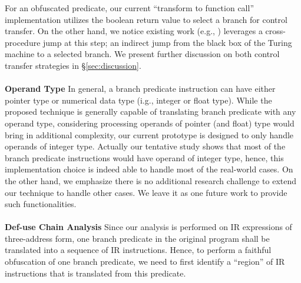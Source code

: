 \documentclass[lnicst]{svmultln}
\begin{document}
For an obfuscated predicate, our current ``transform to function call''
implementation utilizes the boolean return value to select a branch for control
transfer. On the other hand, we notice existing work (e.g., \cite{Ma, Maieee})
leverages a cross-procedure jump at this step; an indirect jump from the black
box of the Turing machine to a selected branch. We present further discussion on
both control transfer strategies in \S\ref{sec:discussion}.
\\\\
\noindent \textbf{Operand Type} In general, a branch predicate instruction can
have either pointer type or numerical data type (i.g., integer or float type).
While the proposed technique is generally capable of translating branch
predicate with any operand type, considering processing operands of pointer (and
float) type would bring in additional complexity, our current prototype is
designed to only handle operands of integer type. Actually our tentative study
shows that most of the branch predicate instructions would have operand of
integer type, hence, this implementation choice is indeed able to handle most of
the real-world cases. On the other hand, we emphasize there is no additional
research challenge to extend our technique to handle other cases. We leave it as
one future work to provide such functionalities.
\\\\
\noindent \textbf{Def-use Chain Analysis} Since our analysis is performed on IR
expressions of three-address form, one branch predicate in the original program
shall be translated into a sequence of IR instructions. Hence, to perform a
faithful obfuscation of one branch predicate, we need to first identify a
``region'' of IR instructions that is translated from this predicate.
\end{document}
